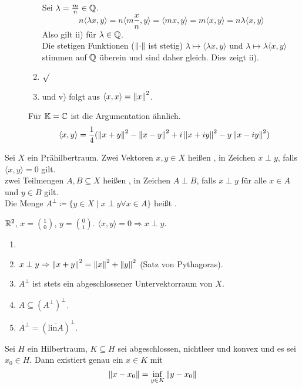 \begin{beweis}
\begin{description}
\begin{enumerate}
			Sei $ \lambda=\frac{m}{n}\in\mathbb{Q} $.
			\[ n\langle\lambda x,y\rangle=n\langle m\frac{x}{n},y\rangle=\langle mx,y\rangle=m\langle x,y\rangle=n\lambda\langle x,y\rangle  \]
			Also gilt ii) f\"ur $ \lambda\in\mathbb{Q} $.\\
			Die stetigen Funktionen ($ \left\|\cdot\right\| $ ist stetig) $ \lambda\mapsto\langle\lambda x,y\rangle $ und $ \lambda\mapsto\lambda\langle x,y\rangle $ stimmen auf $ \mathbb{Q} $ \"uberein und sind daher gleich. Dies zeigt ii).
			\item $ \surd $
			\item und v) folgt aus $ \langle x,x\rangle=\left\|x\right\|^2 $.
		\end{enumerate}
		F\"ur $ \mathbb{K}=\mathbb{C} $ ist die Argumentation \"ahnlich.
		\[ \langle x,y\rangle=\frac{1}{4}(\left\|x+y\right\|^2-\left\|x-y\right\|^2+i\left\|x+iy\right\|^2-y\left\|x-iy\right\|^2) \]
	\end{description}
\end{beweis}
\begin{definition}
	Sei $ X $ ein Pr\"ahilbertraum. Zwei Vektoren $ x,y\in X $ hei\ss en , in Zeichen $ x\perp y $, falls $ \langle x,y\rangle=0 $ gilt.\\
	zwei Teilmengen $ A,B\subseteq X $ hei\ss en , in Zeichen $ A\perp B $, falls $ x\perp y $ f\"ur alle $ x\in A $ und $ y\in B $ gilt.\\
	Die Menge $ A^\perp\coloneqq\lbrace y\in X\mid x\perp y\forall x\in A\rbrace $ hei\ss t .
\end{definition}
\begin{beispiel*}
	$ \mathbb{R}^2 $, $ x=\binom{1}{0} $, $ y=\binom{0}{1} $. $ \langle x,y\rangle=0\Rightarrow x\perp y $.
\end{beispiel*}
\begin{bemerkung*}
	\begin{enumerate}
		\item[]
		\item $ x\perp y\Rightarrow\left\|x+y\right\|^2=\left\|x\right\|^2+\left\|y\right\|^2 $ (Satz von Pythagoras).
		\item $ A^\perp $ ist stets ein abgeschlossener Untervektorraum von $ X $.
		\item $ A\subseteq (A^\perp)^\perp $.
		\item $ A^\perp= (\overline{\text{lin}A})^\perp$.
	\end{enumerate}
\end{bemerkung*}
\begin{satz}[Projektionssatz]
	Sei $ H $ ein Hilbertraum, $ K\subseteq H $ sei abgeschlossen, nichtleer und konvex und es sei $ x_0\in H $. Dann existiert genau ein $ x\in K $ mit
	\[ \left\|x-x_0\right\|=\inf_{y\in K}\left\|y-x_0\right\| \]
\end{satz}
